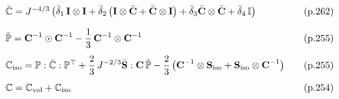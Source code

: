 \begin{equation*}
\begin{array}{lll}
    \bar{\mathbb{C}} = J^{-4/3}\left(\bar{\delta}_1\,\textbf{I} \otimes \textbf{I} + \bar{\delta}_2\,\big(\textbf{I} \otimes \bar{\textbf{C}} + \bar{\textbf{C}} \otimes \textbf{I}\big) + \bar{\delta}_3\bar{\textbf{C}} \otimes \bar{\textbf{C}} + \bar{\delta}_4\,\mathbb{I} \right) \quad &\text{(p.262)}\\[4mm]
    \tilde{\mathbb{P}} = \textbf{C}^{-1} \odot \textbf{C}^{-1} - \displaystyle\frac{\displaystyle{1}}{\displaystyle{3}}\, \textbf{C}^{-1} \otimes \textbf{C}^{-1} \quad &\text{(p.255)}\\[4mm]
    \mathbb{C}_\text{iso} = \mathbb{P} : \bar{\mathbb{C}} : \mathbb{P}^\top + \displaystyle\frac{\displaystyle{2}}{\displaystyle{3}}\, J^{-2/3} \bar{\textbf{S}} : \textbf{C}\,\tilde{\mathbb{P}} - \displaystyle\frac{\displaystyle{2}}{\displaystyle{3}}\,\big(\textbf{C}^{-1}\otimes \textbf{S}_\text{iso} + \textbf{S}_\text{iso}\otimes \textbf{C}^{-1}\big) \quad &\text{(p.255)}\\[4mm]
    \mathbb{C} = \mathbb{C}_\text{vol} + \mathbb{C}_\text{iso} \quad &\text{(p.254)}\\[4mm]
  \end{array}
\end{equation*}



